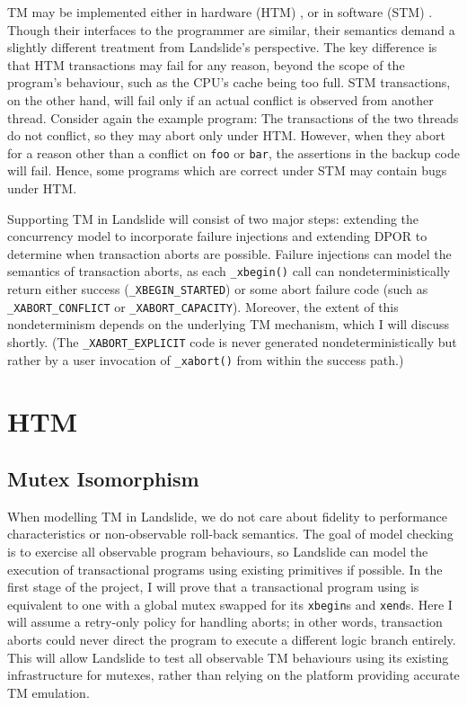 TM may be implemented either in hardware (HTM) \cite{htm-haswell}, or in software (STM) \cite{stm-pldi06}.
Though their interfaces to the programmer are similar, their semantics demand a slightly different treatment from Landslide's perspective.
The key difference is that HTM transactions may fail for any reason, beyond the scope of the program's behaviour, such as the CPU's cache being too full.
STM transactions, on the other hand, will fail only if an actual conflict is observed from another thread.
Consider again the example program: The transactions of the two threads do not conflict, so they may abort only under HTM.
However, when they abort for a reason other than a conflict on {\tt foo} or {\tt bar}, the assertions in the backup code will fail.
Hence, some programs which are correct under STM may contain bugs under HTM.

Supporting TM in Landslide will consist of two major steps:
extending the concurrency model to incorporate failure injections
and extending DPOR to determine when transaction aborts are possible.
Failure injections can model the semantics of transaction aborts, as each {\tt \_xbegin()} call can nondeterministically return either success ({\tt \_XBEGIN\_STARTED}) or some abort failure code (such as {\tt \_XABORT\_CONFLICT} or {\tt \_XABORT\_CAPACITY}).
Moreover, the extent of this nondeterminism depends on the underlying TM mechanism, which I will discuss shortly.
(The {\tt \_XABORT\_EXPLICIT} code is never generated nondeterministically but rather by a user invocation of {\tt \_xabort()} from within the success path.)


\section{HTM}

\subsection{Mutex Isomorphism}
When modelling TM in Landslide, we do not care about fidelity to performance characteristics or non-observable roll-back semantics.
The goal of model checking is to exercise all observable program behaviours,
so Landslide can model the execution of transactional programs using existing primitives if possible.
In the first stage of the project, I will prove that a transactional program using is equivalent
to one with a global mutex swapped for its {\tt xbegin}s and {\tt xend}s. %
Here I will assume a retry-only policy for handling aborts;
in other words, transaction aborts could never direct the program to execute a different logic branch entirely.
This will allow Landslide to test all observable TM behaviours using its existing infrastructure for mutexes,
rather than relying on the platform providing accurate TM emulation.

